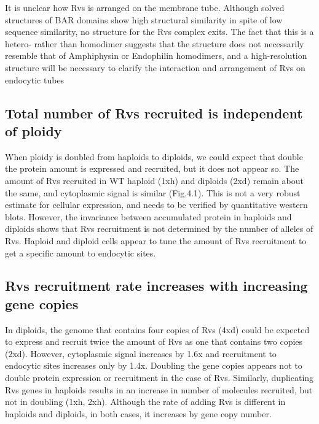 {%

It is unclear how Rvs is arranged on the membrane tube. Although solved structures of BAR domains show high structural similarity in spite of low sequence similarity, no structure for the Rvs complex exits. The fact that this is a hetero- rather than homodimer suggests that the structure does not necessarily resemble that of Amphiphysin or Endophilin homodimers, and a high-resolution structure will be necessary to clarify the interaction and arrangement of Rvs on endocytic tubes

\subsection{Total number of Rvs recruited is independent of ploidy}
When ploidy is doubled from haploids to diploids, we could expect that double the protein amount is expressed and recruited, but it does not appear so. The amount of Rvs recruited in WT haploid (1xh) and diploids (2xd) remain about the same, and cytoplasmic signal is similar (Fig.4.1). This is not a very robust estimate for cellular expression, and needs to be verified by quantitative western blots. However, the invariance between accumulated protein in haploids and diploids shows that Rvs recruitment is not determined by the number of alleles of Rvs. Haploid and diploid cells appear to tune the amount of Rvs recruitment to get a specific amount to endocytic sites.

\subsection{Rvs recruitment rate increases with increasing gene copies}
In diploids, the genome that contains four copies of Rvs (4xd) could be expected to express and recruit twice the amount of Rvs as one that contains two copies (2xd). However, cytoplasmic signal increases by 1.6x and recruitment to endocytic sites increases only by 1.4x. Doubling the gene copies appears not to double protein expression or recruitment in the case of Rvs. Similarly, duplicating Rvs genes in haploids results in an increase in number of molecules recruited, but not in doubling (1xh, 2xh). Although the rate of adding Rvs is different in haploids and diploids, in both cases, it increases by gene copy number. 


}

